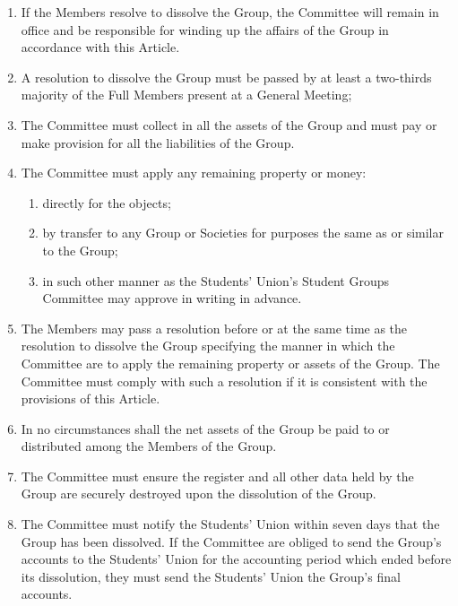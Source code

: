\documentclass[12pt]{constitution}
\begin{document}
\begin{enumerate}
    \item If the Members resolve to dissolve the Group, the Committee will remain in office and be responsible for winding up the affairs of the Group in accordance with this Article.
    \item A resolution to dissolve the Group must be passed by at least a two-thirds majority of the Full Members present at a General Meeting;
    \item The Committee must collect in all the assets of the Group and must pay or make provision for all the liabilities of the Group.
    \item The Committee must apply any remaining property or money:
    \begin{enumerate}
        \item directly for the objects;
        \item by transfer to any Group or Societies for purposes the same as or similar to the Group;
        \item in such other manner as the Students' Union's Student Groups Committee may approve in writing in advance.
    \end{enumerate}

    \item The Members may pass a resolution before or at the same time as the resolution to dissolve the Group specifying the manner in which the Committee are to apply the remaining property or assets of the Group.  The Committee must comply with such a resolution if it is consistent with the provisions of this Article.
    \item In no circumstances shall the net assets of the Group be paid to or distributed among the Members of the Group.
    \item The Committee must ensure the register and all other data held by the Group are securely destroyed upon the dissolution of the Group.
    \item The Committee must notify the Students' Union within seven days that the Group has been dissolved.  If the Committee are obliged to send the Group's accounts to the Students' Union for the accounting period which ended before its dissolution, they must send the Students' Union the Group's final accounts.
\end{enumerate}


\label{article:interpretation}
\end{document}
